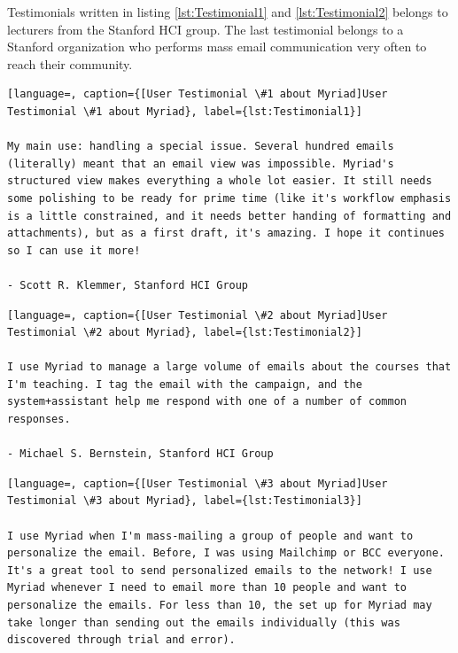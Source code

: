Testimonials written in listing \ref{lst:Testimonial1} and \ref{lst:Testimonial2} belongs to lecturers from the Stanford \ac{HCI} group. The last testimonial belongs to a Stanford organization who performs mass email communication very often to reach their community.

\vspace{1cm}

\clearpage


\begin{lstlisting}[language=, caption={[User Testimonial \#1 about Myriad]User Testimonial \#1 about Myriad}, label={lst:Testimonial1}]

My main use: handling a special issue. Several hundred emails (literally) meant that an email view was impossible. Myriad's structured view makes everything a whole lot easier. It still needs some polishing to be ready for prime time (like it's workflow emphasis is a little constrained, and it needs better handing of formatting and attachments), but as a first draft, it's amazing. I hope it continues so I can use it more!

- Scott R. Klemmer, Stanford HCI Group
\end{lstlisting}

\vspace{1cm}

\begin{lstlisting}[language=, caption={[User Testimonial \#2 about Myriad]User Testimonial \#2 about Myriad}, label={lst:Testimonial2}]

I use Myriad to manage a large volume of emails about the courses that I'm teaching. I tag the email with the campaign, and the system+assistant help me respond with one of a number of common responses.

- Michael S. Bernstein, Stanford HCI Group
\end{lstlisting}

\vspace{1cm}

\begin{lstlisting}[language=, caption={[User Testimonial \#3 about Myriad]User Testimonial \#3 about Myriad}, label={lst:Testimonial3}]

I use Myriad when I'm mass-mailing a group of people and want to personalize the email. Before, I was using Mailchimp or BCC everyone. It's a great tool to send personalized emails to the network! I use Myriad whenever I need to email more than 10 people and want to personalize the emails. For less than 10, the set up for Myriad may take longer than sending out the emails individually (this was discovered through trial and error).
\end{lstlisting}

